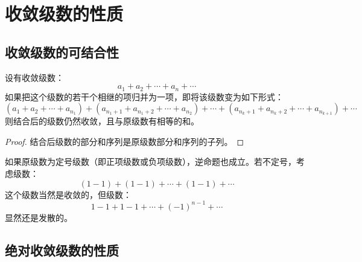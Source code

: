 \section{收敛级数的性质}

\subsection{收敛级数的可结合性}
\begin{theorem}
	设有收敛级数：
	\begin{equation*}
		a_1+a_2+\cdots+a_n+\cdots
	\end{equation*}
	如果把这个级数的若干个相继的项归并为一项，即将该级数变为如下形式：
	\begin{equation*}
		(a_1+a_2+\cdots+a_{n_1})+(a_{n_1+1}+a_{n_1+2}+\cdots+a_{n_2})+\cdots+(a_{n_k+1}+a_{n_k+2}+\cdots+a_{n_{k+1}})+\cdots
	\end{equation*}
	则结合后的级数仍然收敛，且与原级数有相等的和。
\end{theorem}
\begin{proof}
	结合后级数的部分和序列是原级数部分和序列的子列。
\end{proof}
如果原级数为定号级数（即正项级数或负项级数），逆命题也成立。若不定号，考虑级数：
\begin{equation*}
	(1-1)+(1-1)+\cdots+(1-1)+\cdots
\end{equation*}
这个级数当然是收敛的，但级数：
\begin{equation*}
	1-1+1-1+\cdots+(-1)^{n-1}+\cdots
\end{equation*}
显然还是发散的。

\subsection{绝对收敛级数的性质}
